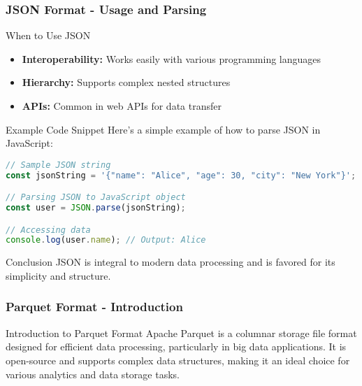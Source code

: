 \documentclass[aspectratio=169]{beamer}
\begin{document}
\begin{frame}[fragile]
    \frametitle{JSON Format - Usage and Parsing}
    \begin{block}{When to Use JSON}
        \begin{itemize}
            \item \textbf{Interoperability:} Works easily with various programming languages
            \item \textbf{Hierarchy:} Supports complex nested structures
            \item \textbf{APIs:} Common in web APIs for data transfer
        \end{itemize}
    \end{block}

    \begin{block}{Example Code Snippet}
        Here’s a simple example of how to parse JSON in JavaScript:
        \begin{lstlisting}[language=javascript]
// Sample JSON string
const jsonString = '{"name": "Alice", "age": 30, "city": "New York"}';

// Parsing JSON to JavaScript object
const user = JSON.parse(jsonString);

// Accessing data
console.log(user.name); // Output: Alice
        \end{lstlisting}
    \end{block}
    
    \begin{block}{Conclusion}
        JSON is integral to modern data processing and is favored for its simplicity and structure.
    \end{block}
\end{frame}

\begin{frame}[fragile]
    \frametitle{Parquet Format - Introduction}
    \begin{block}{Introduction to Parquet Format}
        Apache Parquet is a columnar storage file format designed for efficient data processing, particularly in big data applications. 
        It is open-source and supports complex data structures, making it an ideal choice for various analytics and data storage tasks.
    \end{block}
\end{frame}
\end{document}
